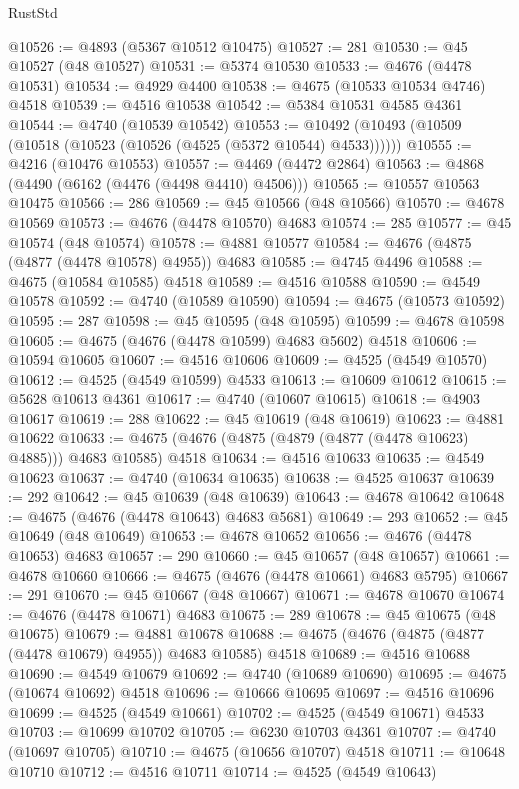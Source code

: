 \begin{lexlean}{RustStd}
\begin{coremodule}
{\begin{coremodule}
{{{{{{{{{{{{{{{{{{{{{{{{{{{{{{{{{{{{{{{{{{{{{{{{{{{{{{{{{{{{@10526 := @4893 (@5367 @10512 @10475)
@10527 := 281
@10530 := @45 @10527 (@48 @10527)
@10531 := @5374 @10530
@10533 := @4676 (@4478 @10531)
@10534 := @4929 @4400
@10538 := @4675 (@10533 @10534 @4746) @4518
@10539 := @4516 @10538
@10542 := @5384 @10531 @4585 @4361
@10544 := @4740 (@10539 @10542)
@10553 := @10492 (@10493 (@10509 (@10518 (@10523 (@10526 (@4525 (@5372 @10544) @4533))))))
@10555 := @4216 (@10476 @10553)
@10557 := @4469 (@4472 @2864)
@10563 := @4868 (@4490 (@6162 (@4476 (@4498 @4410) @4506)))
@10565 := @10557 @10563 @10475
@10566 := 286
@10569 := @45 @10566 (@48 @10566)
@10570 := @4678 @10569
@10573 := @4676 (@4478 @10570) @4683
@10574 := 285
@10577 := @45 @10574 (@48 @10574)
@10578 := @4881 @10577
@10584 := @4676 (@4875 (@4877 (@4478 @10578) @4955)) @4683
@10585 := @4745 @4496
@10588 := @4675 (@10584 @10585) @4518
@10589 := @4516 @10588
@10590 := @4549 @10578
@10592 := @4740 (@10589 @10590)
@10594 := @4675 (@10573 @10592)
@10595 := 287
@10598 := @45 @10595 (@48 @10595)
@10599 := @4678 @10598
@10605 := @4675 (@4676 (@4478 @10599) @4683 @5602) @4518
@10606 := @10594 @10605
@10607 := @4516 @10606
@10609 := @4525 (@4549 @10570)
@10612 := @4525 (@4549 @10599) @4533
@10613 := @10609 @10612
@10615 := @5628 @10613 @4361
@10617 := @4740 (@10607 @10615)
@10618 := @4903 @10617
@10619 := 288
@10622 := @45 @10619 (@48 @10619)
@10623 := @4881 @10622
@10633 := @4675 (@4676 (@4875 (@4879 (@4877 (@4478 @10623) @4885))) @4683 @10585) @4518
@10634 := @4516 @10633
@10635 := @4549 @10623
@10637 := @4740 (@10634 @10635)
@10638 := @4525 @10637
@10639 := 292
@10642 := @45 @10639 (@48 @10639)
@10643 := @4678 @10642
@10648 := @4675 (@4676 (@4478 @10643) @4683 @5681)
@10649 := 293
@10652 := @45 @10649 (@48 @10649)
@10653 := @4678 @10652
@10656 := @4676 (@4478 @10653) @4683
@10657 := 290
@10660 := @45 @10657 (@48 @10657)
@10661 := @4678 @10660
@10666 := @4675 (@4676 (@4478 @10661) @4683 @5795)
@10667 := 291
@10670 := @45 @10667 (@48 @10667)
@10671 := @4678 @10670
@10674 := @4676 (@4478 @10671) @4683
@10675 := 289
@10678 := @45 @10675 (@48 @10675)
@10679 := @4881 @10678
@10688 := @4675 (@4676 (@4875 (@4877 (@4478 @10679) @4955)) @4683 @10585) @4518
@10689 := @4516 @10688
@10690 := @4549 @10679
@10692 := @4740 (@10689 @10690)
@10695 := @4675 (@10674 @10692) @4518
@10696 := @10666 @10695
@10697 := @4516 @10696
@10699 := @4525 (@4549 @10661)
@10702 := @4525 (@4549 @10671) @4533
@10703 := @10699 @10702
@10705 := @6230 @10703 @4361
@10707 := @4740 (@10697 @10705)
@10710 := @4675 (@10656 @10707) @4518
@10711 := @10648 @10710
@10712 := @4516 @10711
@10714 := @4525 (@4549 @10643)
}}}}}}}}}}}}}}}}}}}}}}}}}}}}}}}}}}}}}}}}}}}}}}}}}}}}}}}}}}}}
\end{coremodule}}
\end{coremodule}
\end{lexlean}
